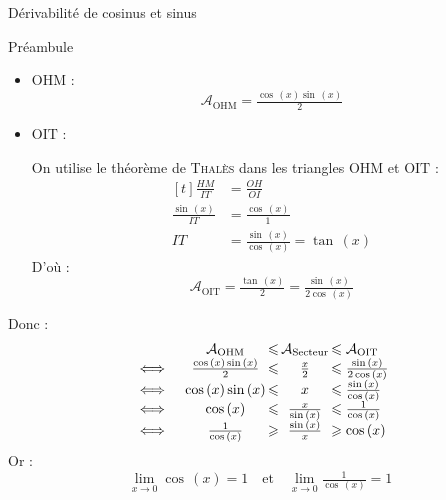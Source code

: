 \documentclass{cours}
\let\frac\tfrac %
\begin{document}
\begin{Gpartie}{Dérivabilité de cosinus et sinus}
\begin{Spartie}{Préambule}
\begin{itemize}
                \item $\mathrm{OHM}$ : \[\mathcal{A}_\mathrm{OHM}=\frac{\cos\,(x)\sin\,(x)}{2}\]

                \item $\mathrm{OIT}$ :
                
                On utilise le théorème de \textsc{Thalès} dans les triangles $\mathrm{OHM}$ et $\mathrm{OIT}$ : 
                \[\begin{aligned}[t]
                    \frac{HM}{IT} &= \frac{OH}{OI} \\[1.5ex]
                    \frac{\sin\,(x)}{IT} &=\frac{\cos\,(x)}{1} \\[1.5ex]
                    IT &= \frac{\sin\,(x)}{\cos\,(x)}=\tan\,(x)
                \end{aligned}\]
                D'où :  \[\mathcal{A}_\mathrm{OIT}=\frac{\tan\,(x)}{2}=\frac{\sin\,(x)}{2\cos\,(x)}\]
            \end{itemize}
        
            \renewcommand*{\arraystretch}{2} %

            Donc :~
            \[\begin{array}{ r@{\,} c@{\,} c@{\,} c@{\,} l@{\,} }
                    &\quad\mathcal{A}_\mathrm{OHM}  & \leq & \mathcal{A}_\text{Secteur} & \leq\mathcal{A}_\mathrm{OIT} \\
                \iff&\quad\frac{\cos\,(x)\sin\,(x)}{2}  & \leq & \frac{x}{2}                & \leq\frac{\sin\,(x)}{2\cos\,(x)} \\
                \iff&\quad\cos\,(x)\sin\,(x)            & \leq & x                          & \leq\frac{\sin\,(x)}{\cos\,(x)} \\
                \iff&\quad\cos\,(x)                   & \leq & \frac{x}{\sin\,(x)}          & \leq\frac{1}{\cos\,(x)} \\
                \iff&\quad\frac{1}{\cos\,(x)}         & \geq & \frac{\sin\,(x)}{x}          & \geq\cos\,(x) 
            \end{array}\]
            Or : \[\lim\limits_{x\to0}\cos\,(x)=1\quad\text{et}\quad\lim\limits_{x\to0}\frac{1}{\cos\,(x)}=1\]


\end{Spartie}
\end{Gpartie}
\end{document}
